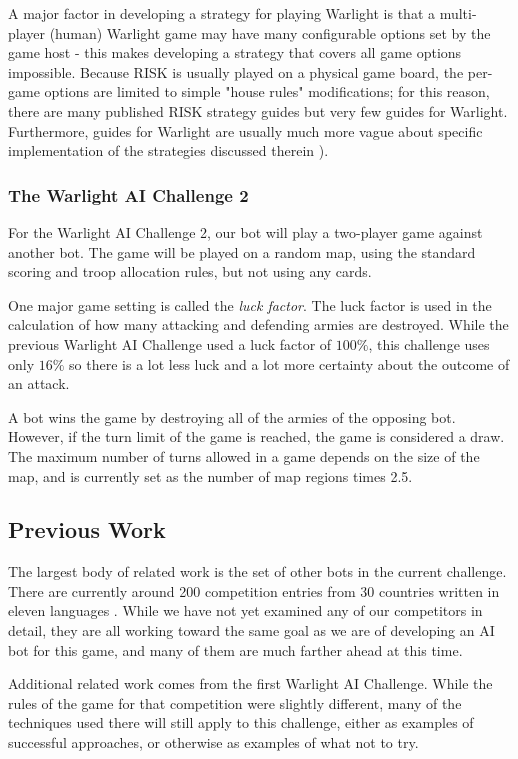 \documentclass[a4paper,11pt]{article}
\begin{document}
A major factor in developing a strategy for playing Warlight is that a multi-player 
(human) Warlight game may have many configurable options set by the game host - 
this makes developing a strategy that covers all game options impossible. Because 
RISK is usually played on a physical game board, the per-game options are limited 
to simple "house rules" modifications; for this reason, there are many published 
RISK strategy guides but very few guides for Warlight.  Furthermore, guides for 
Warlight are usually much more vague about specific implementation of the strategies 
discussed therein \cite{warlightguide}).

\subsubsection{The Warlight AI Challenge 2}
For the Warlight AI Challenge 2, our bot will play a two-player game against 
another bot.  The game will be played on a random map, using the standard scoring 
and troop allocation rules, but not using any cards.

One major game setting is called the \emph{luck factor}. The luck factor is used 
in the calculation of how many attacking and defending armies are destroyed.  While 
the previous Warlight AI Challenge used a luck factor of $100\%$, this challenge uses 
only $16\%$ so there is a lot less luck and a lot more certainty about the outcome of 
an attack.

A bot wins the game by destroying all of the armies of the opposing bot.  However, 
if the turn limit of the game is reached, the game is considered a draw.  The 
maximum number of turns allowed in a game depends on the size of the map, and is 
currently set as the number of map regions times 2.5.

\subsection{Previous Work}\label{sec:previous}
The largest body of related work is the set of other bots in the current challenge.  
There are currently around 200 competition entries from 30 countries written in 
eleven languages \cite{warlight}.  While we have not yet examined any of our competitors 
in detail, they are all working toward the same goal as we are of developing an AI bot for 
this game, and many of them are much farther ahead at this time.

Additional related work comes from the first Warlight AI Challenge.  While the 
rules of the game for that competition were slightly different, many of the 
techniques used there will still apply to this challenge, either as examples of 
successful approaches, or otherwise as examples of what not to try.
\end{document}
